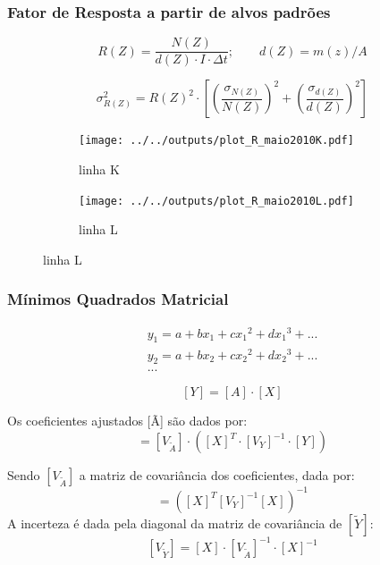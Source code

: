 \begin{frame}
  \frametitle{Fator de Resposta a partir de alvos padrões}
  \begin{footnotesize}
  \begin{equation*}
    R(Z) = \frac{N(Z)}{d(Z) \cdot I \cdot \Delta t}; \qquad d(Z)=m(z)/A
  \end{equation*}
    
  \begin{equation*}
  \sigma_{R(Z)}^2 = {R(Z)}^2 \cdot \left[ \left(\frac{\sigma_{N(Z)}}{N(Z)}\right)^2 + 
  \left(\frac{\sigma_{d(Z)}}{d(Z)}\right)^2 
  \right]
  \end{equation*}
\end{footnotesize}  
  \begin{figure}[H]
  	\begin{subfigure}[b]{0.4\textwidth}
  		\texttt{[image: ../../outputs/plot\_R\_maio2010K.pdf]}
  		\caption{linha K}
  	\end{subfigure}%
  	\begin{subfigure}[b]{0.4\textwidth}
  		\texttt{[image: ../../outputs/plot\_R\_maio2010L.pdf]}
  		\caption{linha L}
  	\end{subfigure}
  \end{figure}
\end{frame}

\begin{frame}
  \frametitle{Mínimos Quadrados Matricial} 
\begin{equation*}
  \label{eq:polinomio}
  \begin{split}
    y_1 = a + b x_1 + c{x_1}^2 + d{x_1}^3 + ...\\
    y_2 = a + b x_2 + c{x_2}^2 + d{x_2}^3 + ... \\
    ...
  \end{split}
\end{equation*}

\begin{equation*}
  \label{eq:polinomioMatriz}
  [Y] = [A] \cdot [X]
\end{equation*}

Os coeficientes ajustados [Ã] são dados por:
\begin{equation*}
  [\tilde{A}] = [V_{\tilde{A}}] \cdot ([X]^T \cdot {[V_Y]}^{-1} \cdot [Y])
\end{equation*}

Sendo $[V_{\tilde{A}}]$ a matriz de covariância dos coeficientes, dada por:
\begin{equation*}
  [V_{\tilde{A}}] = ([X]^T [V_Y]^{-1} [X])^{-1}
\end{equation*}
A incerteza é dada pela diagonal da matriz de covariância de $[\tilde{Y}]$:
\begin{equation*}
\label{eq:matrizcovarianciaY}
[V_{\tilde{Y}}] = [X] \cdot [V_{\tilde{A}}]^{-1} \cdot [X]^{-1}
\end{equation*}
\end{frame}

